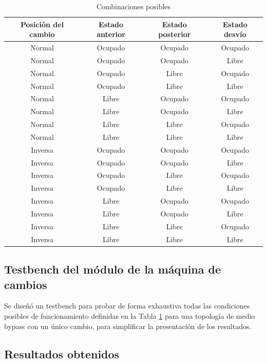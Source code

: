 			\begin{table}[!hbt]
			\renewcommand{\arraystretch}{1.3}
			\caption{Combinaciones posibles}
			\label{tabla_cambios}
			\centering
			\begin{tabular}{ c  c  c  c}
			\hline
			Posición del cambio & Estado anterior & Estado posterior & Estado desvío \\	
			\hline
			Normal & Ocupado & Ocupado  & Ocupado \\
			Normal & Ocupado & Ocupado  & Libre \\
			Normal & Ocupado & Libre  & Ocupado \\
			Normal & Ocupado & Libre  & Libre \\
			Normal & Libre & Ocupado  & Ocupado \\
			Normal & Libre & Ocupado  & Libre \\
			Normal & Libre & Libre  & Ocupado \\
			Normal & Libre & Libre  & Libre \\
			Inversa & Ocupado & Ocupado  & Ocupado \\
			Inversa & Ocupado & Ocupado  & Libre \\
			Inversa & Ocupado & Libre  & Ocupado \\
			Inversa & Ocupado & Libre  & Libre \\
			Inversa & Libre & Ocupado  & Ocupado \\
			Inversa & Libre & Ocupado  & Libre \\
			Inversa & Libre & Libre  & Ocupado \\
			Inversa & Libre & Libre  & Libre \\	
			\end{tabular}
			\end{table}	
	
	\subsection{Testbench del módulo de la máquina de cambios}
		
		Se diseñó un testbench para probar de forma exhaustiva todas las condiciones posibles de funcionamiento definidas en la Tabla \ref{tabla_cambios} para una topología de medio bypass con un único cambio, para simplificar la presentación de los resultados.
						
	\subsection{Resultados obtenidos}
			
